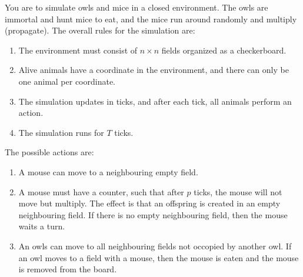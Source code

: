 You are to simulate owls and mice in a closed environment. The owls are immortal and hunt mice to eat, and the mice run around randomly and multiply (propagate). The overall rules for the simulation are:
\begin{enumerate}
\item The environment must consist of $n\times n$ fields organized as a checkerboard.
\item Alive animals have a coordinate in the environment, and there can only be one animal per coordinate.
\item The simulation updates in ticks, and after each tick, all animals perform an action.
\item The simulation runs for $T$ ticks.
\end{enumerate}
The possible actions are:
\begin{enumerate}[resume]
\item A mouse can move to a neighbouring empty field.
\item A mouse must have a counter, such that after $p$ ticks, the mouse will not move but multiply. The effect is that an offspring is created in an empty neighbouring field. If there is no empty neighbouring field, then the mouse waits a turn.
\item An owls can move to all neighbouring fields not occopied by another owl. If an owl moves to a field with a mouse, then the mouse is eaten and the mouse is removed from the board.
\end{enumerate}

